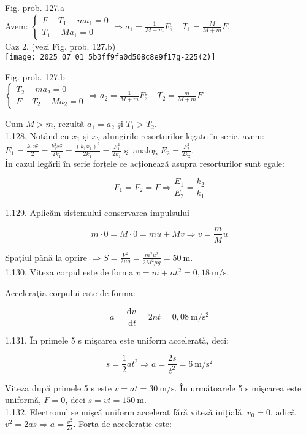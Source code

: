 Fig. prob. 127.a\\
Avem: $\left\{\begin{array}{l}F-T_{1}-m a_{1}=0 \\ T_{1}-M a_{1}=0\end{array} \Rightarrow a_{1}=\frac{1}{M+m} F ; \quad T_{1}=\frac{M}{M+m} F\right.$.\\
Caz 2. (vezi Fig. prob. 127.b)\\
\texttt{[image: 2025\_07\_01\_5b3ff9fa0d508c8e9f17g-225(2)]}

Fig. prob. 127.b\\
$\left\{\begin{array}{l}T_{2}-m a_{2}=0 \\ F-T_{2}-M a_{2}=0\end{array} \Rightarrow a_{2}=\frac{1}{M+m} F ; \quad T_{2}=\frac{m}{M+m} F\right.$

Cum $M>m$, rezultă $a_{1}=a_{2}$ şi $T_{1}>T_{2}$.\\
1.128. Notând cu $x_{1}$ şi $x_{2}$ alungirile resorturilor legate în serie, avem:\\
$E_{1}=\frac{k_{1} x_{1}^{2}}{2}=\frac{k_{1}^{2} x_{1}^{2}}{2 k_{1}}=\frac{\left(k_{1} x_{1}\right)^{2}}{2 k_{1}}=\frac{F_{1}^{2}}{2 k_{1}}$ şi analog $E_{2}=\frac{F_{2}^{2}}{2 k_{2}}$.\\
În cazul legării în serie forțele ce acționează asupra resorturilor sunt egale:

$$
F_{1}=F_{2}=F \Rightarrow \frac{E_{1}}{E_{2}}=\frac{k_{2}}{k_{1}}
$$

1.129. Aplicăm sistemului conservarea impulsului

$$
m \cdot 0=M \cdot 0=m u+M v \Rightarrow v=\frac{m}{M} u
$$

Spațiul până la oprire $\Rightarrow S=\frac{V^{2}}{2 \mu g}=\frac{m^{2} u^{2}}{2 M^{2} \mu g}=50 \mathrm{~m}$.\\
1.130. Viteza corpul este de forma $v=m+n t^{2}=0,18 \mathrm{~m} / \mathrm{s}$.

Acceleraţia corpului este de forma:

$$
a=\frac{\mathrm{d} v}{\mathrm{~d} t}=2 n t=0,08 \mathrm{~m} / \mathrm{s}^{2}
$$

1.131. În primele 5 s mişcarea este uniform accelerată, deci:

$$
s=\frac{1}{2} a t^{2} \Rightarrow a=\frac{2 s}{t^{2}}=6 \mathrm{~m} / \mathrm{s}^{2}
$$

Viteza după primele 5 s este $v=a t=30 \mathrm{~m} / \mathrm{s}$. În următoarele 5 s mişcarea este uniformă, $F=0$, deci $s=v t=150 \mathrm{~m}$.\\
1.132. Electronul se mişcă uniform accelerat fără viteză inițială, $v_{0}=0$, adică $v^{2}=2 a s \Rightarrow a=\frac{v^{2}}{2 s}$. Forța de accelerație este:

